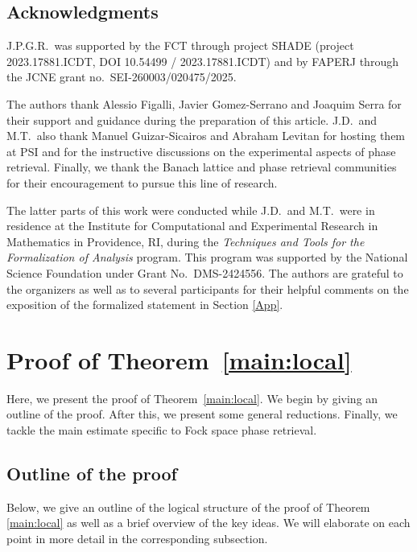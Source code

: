 \documentclass[11pt]{amsart}
\theoremstyle{remark}
\begin{document}
\subsection{Acknowledgments}
J.P.G.R.~was supported by the FCT through project SHADE (project 2023.17881.ICDT, DOI  10.54499 / 2023.17881.ICDT) and by FAPERJ through the JCNE grant no.~SEI-260003/020475/2025.
 \vspace{0.5em}

The authors thank Alessio Figalli, Javier Gomez-Serrano and Joaquim Serra for their support and guidance during the preparation of this article. J.D.~and M.T.~also thank Manuel Guizar-Sicairos and Abraham Levitan for hosting them at PSI and for the instructive discussions on the experimental aspects of phase retrieval. Finally, we thank the Banach lattice and phase retrieval communities for their encouragement to pursue this line of research. 
 \vspace{0.5em}

The latter parts of this work were conducted while J.D.~and M.T.~were in residence at the Institute for Computational and Experimental Research in Mathematics in Providence, RI, during the \emph{Techniques and Tools for the Formalization of Analysis} program. This program was supported by the National Science Foundation under Grant No.~DMS-2424556. The authors are grateful to the organizers as well as to several participants for their helpful comments on the exposition of the formalized statement in Section \ref{App}.

\section{Proof of Theorem~\ref{main:local}}
Here, we present the proof of Theorem~\ref{main:local}. We begin by giving an outline of the proof. After this, we present some general reductions. Finally, we tackle the main estimate specific to Fock space phase retrieval. %

\subsection{Outline of the proof}\label{sec:strategy}
Below, we give an outline of the logical structure of the proof of Theorem \ref{main:local} as well as a brief overview of the key ideas. We will elaborate on each point in more detail in the corresponding subsection. 
 \vspace{0.5em}
\end{document}
